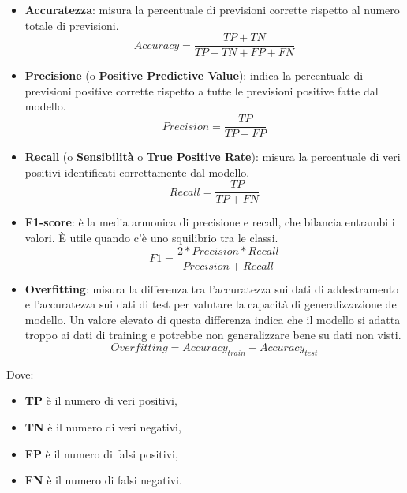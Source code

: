 \begin{itemize}
    \item \textbf{Accuratezza}: misura la percentuale di previsioni corrette rispetto al numero totale di previsioni.
    \begin{equation} Accuracy = \frac{TP+TN}{TP+TN+FP+FN}\end{equation}

    \item \textbf{Precisione} (o \textbf{Positive Predictive Value}): indica la percentuale di previsioni positive corrette rispetto a tutte le previsioni positive fatte dal modello.
    \begin{equation} Precision = \frac{TP}{TP+FP}\end{equation}

    \item \textbf{Recall} (o \textbf{Sensibilità} o \textbf{True Positive Rate}): misura la percentuale di veri positivi identificati correttamente dal modello.
    \begin{equation} Recall = \frac{TP}{TP+FN}\end{equation}

    \item \textbf{F1-score}: è la media armonica di precisione e recall, che bilancia entrambi i valori. È utile quando c'è uno squilibrio tra le classi.\begin{equation} F1 = \frac{2*Precision*Recall}{Precision+Recall}\end{equation}

    \item \textbf{Overfitting}: misura la differenza tra l'accuratezza sui dati di addestramento e l'accuratezza sui dati di test per valutare la capacit\`a di generalizzazione del modello. Un valore elevato di questa differenza indica che il modello si adatta troppo ai dati di training e potrebbe non generalizzare bene su dati non visti.\begin{equation}Overfitting = Accuracy_{train} - Accuracy_{test}\end{equation}
\end{itemize}

Dove:
\begin{itemize}
    \item \textbf{TP} è il numero di veri positivi,
    \item \textbf{TN} è il numero di veri negativi,
    \item \textbf{FP} è il numero di falsi positivi,
    \item \textbf{FN} è il numero di falsi negativi.
\end{itemize}

